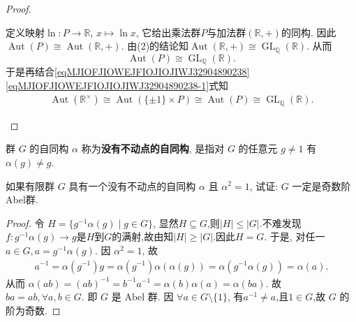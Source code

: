 \documentclass[../../main.tex]{subfiles}%
\begin{document}
\begin{proof}
\begin{enumerate}[(1)]
\begin{enumerate}[(i)]
定义映射$\ln:P\to\mathbb{R}$, $x\mapsto\ln x$, 它给出乘法群$P$与加法群$(\mathbb{R},+)$的同构. 因此$\operatorname{Aut}(P)\cong\operatorname{Aut}(\mathbb{R},+)$. 由(2)的结论知$\operatorname{Aut}(\mathbb{R},+)\cong\operatorname{GL}_{\mathbb{Q}}(\mathbb{R})$. 从而$$\operatorname{Aut}(P)\cong\operatorname{GL}_{\mathbb{Q}}(\mathbb{R}).$$
于是再结合\eqref{eqMJIOFJIOWEJFIOJIOJIWJ32904890238}\eqref{eqMJIOFJIOWEJFIOJIOJIWJ32904890238-1}式知
\begin{align*}
\operatorname{Aut}(\mathbb{R}^{\times})\cong \operatorname{Aut}(\{\pm 1\} \times P)\cong \operatorname{Aut}(P)\cong\operatorname{GL}_{\mathbb{Q}}(\mathbb{R}).
\end{align*}
\end{enumerate}
\end{enumerate}
\end{proof}

\begin{definition}
群 $G$ 的自同构 $\alpha$ 称为\textbf{没有不动点的自同构}, 是指对 $G$ 的任意元 $g \neq 1$ 有 $\alpha(g) \neq g$. 
\end{definition}

\begin{example}
如果有限群 $G$ 具有一个没有不动点的自同构 $\alpha$ 且 $\alpha^2 = 1$, 试证: $G$ 一定是奇数阶Abel群.
\end{example}
\begin{proof}

令 $H = \{g^{-1}\alpha(g) \mid g \in G\}$, 显然$H\subseteq G$,则$|H|\leqslant |G|$.不难发现$f:g^{-1}\alpha(g)\to g$是$H$到$G$的满射,故由知$|H|\geqslant |G|$.因此$H = G$. 
于是, 对任一 $a \in G, a = g^{-1}\alpha(g)$. 因 $\alpha^2 = 1$, 故
\begin{align*}
a^{-1} = \alpha(g^{-1})g = \alpha(g^{-1})\alpha(\alpha(g)) = \alpha(g^{-1}\alpha(g)) = \alpha(a).
\end{align*}
从而 $\alpha(ab) = (ab)^{-1} = b^{-1}a^{-1} = \alpha(b)\alpha(a) = \alpha(ba)$. 故 $ba = ab, \forall a, b \in G$. 即 $G$ 是 Abel 群. 因 $\forall a \in G\setminus\{1\}$, 有$a^{-1} \neq a$,且$1\in G$,故 $G$ 的阶为奇数.

\end{proof}
\end{document}
